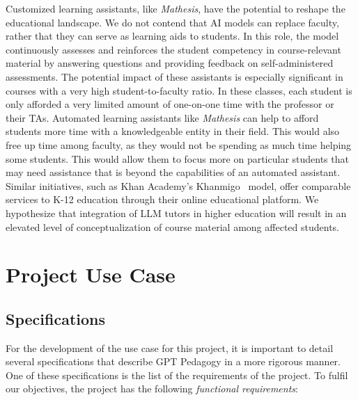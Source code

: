 \documentclass[12pt,a4paper]{article}
\begin{document}
    Customized learning assistants, like \textit{Mathesis}, have the potential to reshape the educational
    landscape. We do not contend that AI models can replace faculty, rather that they can serve as
    learning aids to students. In this role, the model continuously assesses and reinforces the
    student competency in course-relevant material by answering questions and providing feedback on
    self-administered assessments.  The potential impact of these assistants is especially significant
    in courses with a very high student-to-faculty ratio.  In these classes, each student is only
    afforded a very limited amount of one-on-one time with the professor or their TAs.  Automated
    learning assistants like \textit{Mathesis} can help to afford students more time with a
    knowledgeable entity in their field.  This would also free up time among faculty, as they would
    not be spending as much time helping some students.  This would allow them to focus more on
    particular students that may need assistance that is beyond the capabilities of an automated
    assistant.  Similar initiatives, such as Khan Academy's Khanmigo~\cite{khanmigo}
    model, offer comparable services to K-12 education through their online educational platform.
    We hypothesize that integration of LLM tutors in higher education will result in an elevated
    level of conceptualization of course material among affected students.

    \let\thefootnote\relax{}

    \section{Project Use Case}

    \subsection{Specifications}

    For the development of the use case for this project, it is important to detail several
    specifications that describe GPT Pedagogy in a more rigorous manner.  One of these specifications
    is the list of the requirements of the project.  To fulfil our objectives, the
    project has the following \textit{functional requirements}:
\end{document}
